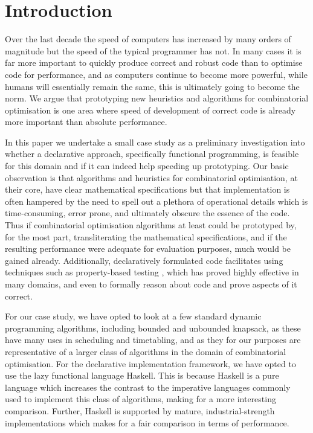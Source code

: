 \section{Introduction}

Over the last decade the speed of computers has increased by many orders of
magnitude but the speed of the typical programmer has not. In many cases it is
far more important to quickly produce correct and robust code than to optimise
code for performance, and as computers continue to become more powerful, while
humans will essentially remain the same, this is ultimately going to become
the norm. We argue that prototyping new heuristics and algorithms for
combinatorial optimisation is one area where speed of development of correct
code is already more important than absolute performance.

In this paper we undertake a small case study as a preliminary investigation
into whether a declarative approach, specifically functional programming, is
feasible for this domain and if it can indeed help speeding up prototyping.
Our basic observation is that algorithms and heuristics for combinatorial
optimisation, at their core, have clear mathematical specifications but that
implementation is often hampered by the need to spell out a plethora of
operational details which is time-consuming, error prone, and ultimately
obscure the essence of the code. Thus if combinatorial optimisation
algorithms at least could be prototyped by, for the most part, transliterating
the mathematical specifications, and if the resulting performance were
adequate for evaluation purposes, much would be gained already. Additionally,
declaratively formulated code facilitates using techniques such as
property-based testing \cite{quickcheck}, which has proved highly effective
in many domains, and even to formally reason about code and prove aspects
of it correct.

For our case study, we have opted to look at a few standard dynamic
programming algorithms, including bounded and unbounded knapsack, as these
have many uses in scheduling and timetabling, and as they for our purposes are
representative of a larger class of algorithms in the domain of combinatorial
optimisation. For the declarative implementation framework, we have opted to
use the lazy functional language Haskell. This is because Haskell is a pure
language which increases the contrast to the imperative languages commonly
used to implement this class of algorithms, making for a more interesting
comparison. Further, Haskell is supported by mature, industrial-strength
implementations which makes for a fair comparison in terms of performance.


